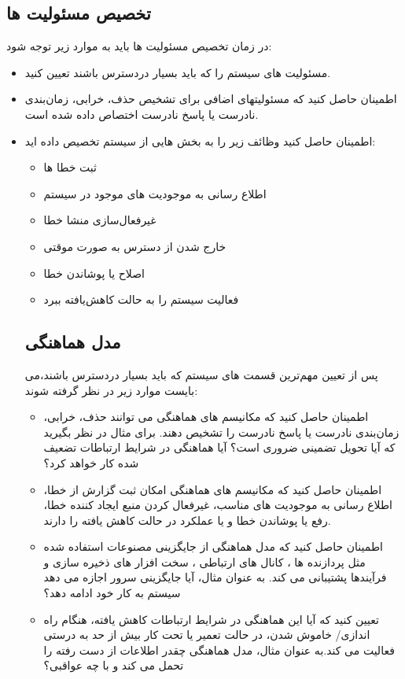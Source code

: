 \subsection{تخصیص مسئولیت ها} 
در زمان تخصیص مسئولیت ها باید  به موارد زیر توجه شود:
\begin{itemize}
\item
مسئولیت های سیستم را که باید بسیار در‌دسترس باشند تعیین کنید.
\item
اطمینان حاصل کنید که مسئولیتهای اضافی برای تشخیص حذف، خرابی، زمان‌بندی نادرست یا پاسخ نادرست اختصاص داده شده است.
\item
اطمینان حاصل کنید وظائف زیر را به بخش هایی از سیستم تخصیص داده اید:
\begin{itemize}
\item
ثبت خطا ها
\item
اطلاع رسانی به موجودیت های موجود در سیستم
\item
غیر‌فعال‌سازی منشا خطا
\item
خارج شدن از دسترس به صورت موقتی
\item
اصلاح یا پوشاندن خطا
\item
فعالیت سیستم را به حالت کاهش‌یافته  ببرد
\end{itemize}
\subsection{مدل هماهنگی}
پس از تعیین مهم‌ترین قسمت های سیستم که باید بسیار در‌دسترس باشند،می بایست موارد زیر در نظر گرفته شوند:
\begin{itemize}
\item
اطمینان حاصل کنید که مکانیسم های هماهنگی می توانند حذف، خرابی، زمان‌بندی نادرست یا پاسخ نادرست را تشخیص دهند. برای مثال در نظر بگیرید که آیا تحویل تضمینی ضروری است؟ آیا هماهنگی در شرایط ارتباطات تضعیف شده کار خواهد کرد؟
\item
اطمینان حاصل کنید که مکانیسم های هماهنگی امکان ثبت گزارش از خطا، اطلاع رسانی به موجودیت های مناسب، غیرفعال کردن منبع ایجاد کننده خطا، رفع یا پوشاندن خطا و یا عملکرد در حالت کاهش یافته را دارند.
\item
اطمینان حاصل کنید که مدل هماهنگی از جایگزینی مصنوعات استفاده شده مثل پردازنده ها ، کانال های ارتباطی ، سخت افزار های ذخیره سازی و فرآیندها پشتیبانی می کند. به عنوان مثال، آیا جایگزینی سرور اجازه می دهد سیستم به کار خود ادامه دهد؟
\item
تعیین کنید که آیا این هماهنگی در شرایط ارتباطات کاهش یافته، هنگام راه اندازی/ خاموش شدن، در حالت تعمیر یا تحت کار بیش از حد به درستی فعالیت می کند.به عنوان مثال، مدل هماهنگی چقدر اطلاعات از دست رفته را تحمل می کند و با چه عواقبی؟
\end{itemize}


\end{itemize}
